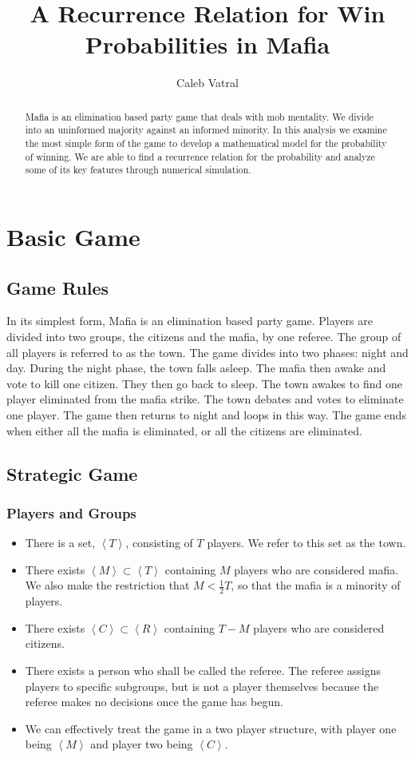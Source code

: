 \documentclass[12pt]{article}
\title{A Recurrence Relation for Win Probabilities in Mafia}
\author{Caleb Vatral}
\begin{document}
\maketitle

\begin{abstract}
Mafia is an elimination based party game that deals with mob mentality. We divide into an uninformed majority against an informed minority. In this analysis we examine the most simple form of the game to develop a mathematical model for the probability of winning. We are able to find a recurrence relation for the probability and analyze some of its key features through numerical simulation.
\end{abstract}

\section{Basic Game}
\subsection{Game Rules}
In its simplest form, Mafia is an elimination based party game. Players are divided into two groups, the citizens and the mafia, by one referee. The group of all players is referred to as the town. The game divides into two phases: night and day. During the night phase, the town falls asleep. The mafia then awake and vote to kill one citizen. They then go back to sleep. The town awakes to find one player eliminated from the mafia strike. The town debates and votes to eliminate one player. The game then returns to night and loops in this way. The game ends when either all the mafia is eliminated, or all the citizens are eliminated.

\subsection{Strategic Game}
\subsubsection{Players and Groups}
\begin{itemize}
	\item There is a set, $\left<T\right>$, consisting of $T$ players. We refer to this set as the town.
	\item There exists  $\left<M\right>\subset\left<T\right>$ containing $M$ players who are considered mafia. We also make the restriction that $M < \frac{1}{2}T$, so that the mafia is a minority of players. 
	\item There exists  $\left<C\right>\subset\left<R\right>$ containing $T-M$ players who are considered citizens.
	\item There exists a person who shall be called the referee. The referee assigns players to specific subgroups, but is not a player themselves because the referee makes no decisions once the game has begun.
	\item We can effectively treat the game in a two player structure, with player one being $\left<M\right>$ and player two being $\left<C\right>$. 
\end{itemize}
\end{document}
